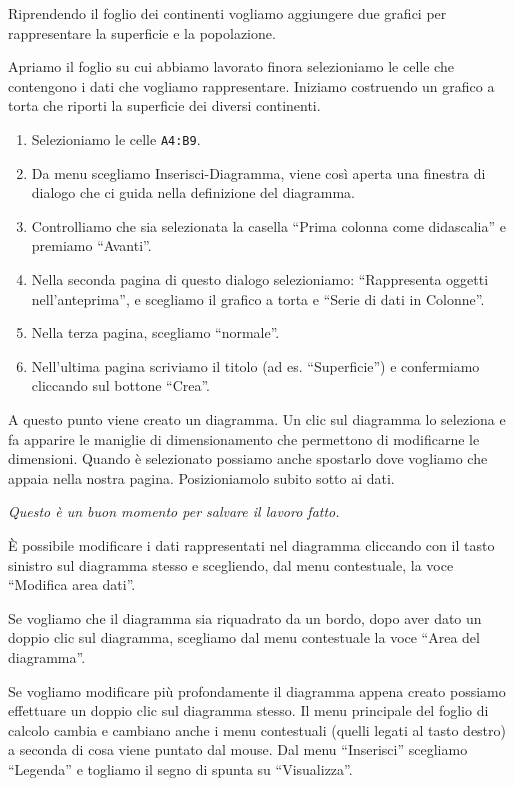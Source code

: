 Riprendendo il foglio dei continenti vogliamo aggiungere due grafici per
rappresentare la superficie e la popolazione.

Apriamo il foglio su cui abbiamo lavorato finora selezioniamo le celle che
contengono i dati che vogliamo rappresentare.
Iniziamo costruendo un grafico a torta che riporti la superficie dei
diversi continenti.

\begin{enumerate}
\item {} 
Selezioniamo le celle \texttt{A4:B9}.

\item {} 
Da menu scegliamo Inserisci-Diagramma, viene così aperta una finestra
di dialogo che ci guida nella definizione del diagramma.

\item {} 
Controlliamo che sia selezionata la casella
``Prima colonna come didascalia'' e premiamo ``Avanti''.

\item {} 
Nella seconda pagina di questo dialogo selezioniamo:
``Rappresenta oggetti nell'anteprima'',
e scegliamo il grafico a torta e ``Serie di dati in Colonne''.

\item {} 
Nella terza pagina, scegliamo ``normale''.

\item {} 
Nell'ultima pagina scriviamo il titolo (ad es. ``Superficie'')
e confermiamo cliccando sul bottone ``Crea''.

\end{enumerate}

A questo punto viene creato un diagramma. Un clic sul diagramma lo seleziona
e fa apparire le maniglie di dimensionamento che permettono di modificarne
le dimensioni.
Quando è selezionato possiamo anche spostarlo dove vogliamo che appaia nella
nostra pagina. Posizioniamolo subito sotto ai dati.

\emph{Questo è un buon momento per salvare il lavoro fatto.}

È possibile modificare i dati rappresentati nel diagramma cliccando con il
tasto sinistro sul diagramma stesso e scegliendo, dal menu contestuale,
la voce ``Modifica area dati''.

Se vogliamo che il diagramma sia riquadrato da un bordo, dopo aver dato un
doppio clic sul diagramma, scegliamo dal menu contestuale la voce ``Area del
diagramma''.

Se vogliamo modificare più profondamente il diagramma appena creato possiamo
effettuare un doppio clic sul diagramma stesso.
Il menu principale del foglio di calcolo cambia e cambiano anche i menu
contestuali (quelli legati al tasto destro) a seconda di cosa viene puntato
dal mouse.
Dal menu ``Inserisci'' scegliamo ``Legenda'' e togliamo il segno di spunta su
``Visualizza''.

